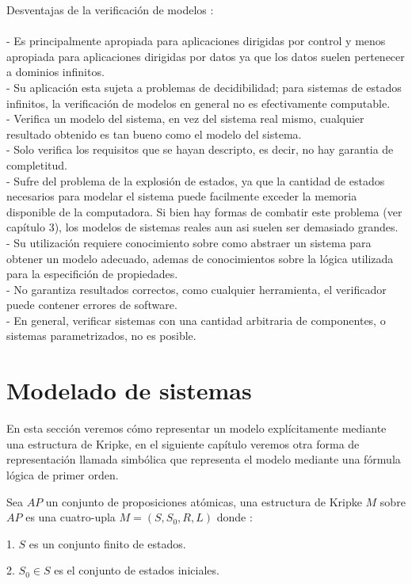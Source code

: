 Desventajas de la verificación de modelos \cite{Baier:2}:\\
\\
- Es principalmente apropiada para aplicaciones dirigidas por control y menos apropiada para aplicaciones dirigidas por datos ya que los datos suelen pertenecer a dominios infinitos.\\
- Su aplicación esta sujeta a problemas de decidibilidad; para sistemas de estados infinitos, la verificación de modelos en general no es efectivamente computable.\\
- Verifica un modelo del sistema, en vez del sistema real mismo, cualquier resultado obtenido es tan bueno como el modelo del sistema.\\
- Solo verifica los requisitos que se hayan descripto, es decir, no hay garantia de completitud.\\
- Sufre del problema de la explosión de estados, ya que la cantidad de estados necesarios para modelar el sistema puede facilmente exceder la memoria disponible de la computadora. Si bien hay formas de combatir este problema (ver capítulo 3), los modelos de sistemas reales aun asi suelen ser demasiado grandes.\\
- Su utilización requiere conocimiento sobre como abstraer un sistema para obtener un modelo adecuado, ademas de conocimientos sobre la lógica utilizada para la especifición de propiedades.\\
- No garantiza resultados correctos, como cualquier herramienta, el verificador puede contener errores de software.\\
- En general, verificar sistemas con una cantidad arbitraria de componentes, o sistemas parametrizados, no es posible.\\

\section{Modelado de sistemas}
En esta sección veremos cómo representar un modelo explícitamente mediante una estructura de Kripke, en el siguiente capítulo veremos otra forma de representación llamada simbólica que representa el modelo mediante una fórmula lógica de primer orden.

Sea $AP$ un conjunto de proposiciones atómicas, una estructura de Kripke $M$ sobre $AP$ es una cuatro-upla $M = (S, S_{0}, R, L)$ donde \cite{Clarke:1}:

1. $S$ es un conjunto finito de estados.

2. $S_{0} \in S$ es el conjunto de estados iniciales.

